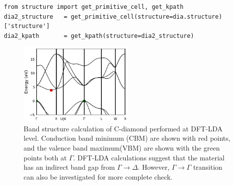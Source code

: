 \begin{lstlisting}
from structure import get_primitive_cell, get_kpath
dia2_structure   = get_primitive_cell(structure=dia.structure)['structure']
dia2_kpath       = get_kpath(structure=dia2_structure)
\end{lstlisting}

\begin{figure}
	\centering
	\includegraphics[width=0.5\textwidth]{figures/lab_excited_band_si}
	\caption{Band structure calculation of C-diamond performed at DFT-LDA level. Conduction band minimum (CBM) are shown with red points, and the valence band maximum(VBM)  are shown with the green points both at $\Gamma$.  DFT-LDA calculations suggest that the material has an indirect band gap from $\Gamma\rightarrow{\Delta}$. However, $\Gamma\rightarrow{\Gamma}$ transition can also be investigated for more complete check. }
	\label{fig:lab_ex_bands}
\end{figure}

